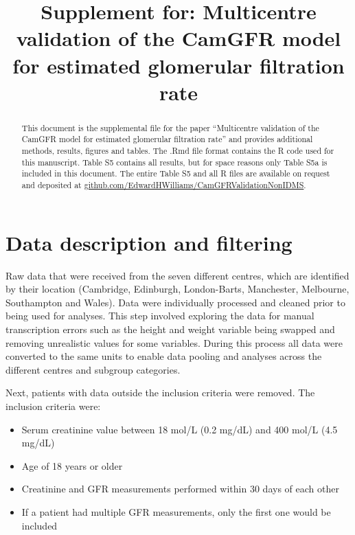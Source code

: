 \documentclass[11pt,]{article}
\title{Supplement for: Multicentre validation of the CamGFR model for estimated
glomerular filtration rate}
\author{}
\date{}
\newcommand{\beginsupplement}{\setcounter{table}{0} \renewcommand{\thetable}{S\arabic{table}} \setcounter{figure}{0} \renewcommand{\thefigure}{S\arabic{figure}}} \usepackage{breqn} \usepackage{biblatex} \usepackage{graphicx} \usepackage{textgreek}
\begin{document}
\maketitle
\begin{abstract}
This document is the supplemental file for the paper ``Multicentre
validation of the CamGFR model for estimated glomerular filtration
rate'' and provides additional methods, results, figures and tables. The
.Rmd file format contains the R code used for this manuscript. Table S5
contains all results, but for space reasons only Table S5a is included
in this document. The entire Table S5 and all R files are available on
request and deposited at
\href{https://github.com/EdwardHWilliams/CamGFRValidationNonIDMS}{github.com/EdwardHWilliams/CamGFRValidationNonIDMS}.
\end{abstract}

\beginsupplement

\section{Data description and
filtering}\label{data-description-and-filtering}

Raw data that were received from the seven different centres, which are
identified by their location (Cambridge, Edinburgh, London-Barts,
Manchester, Melbourne, Southampton and Wales). Data were individually
processed and cleaned prior to being used for analyses. This step
involved exploring the data for manual transcription errors such as the
height and weight variable being swapped and removing unrealistic values
for some variables. During this process all data were converted to the
same units to enable data pooling and analyses across the different
centres and subgroup categories.

Next, patients with data outside the inclusion criteria were removed.
The inclusion criteria were:

\begin{itemize}
\item Serum creatinine value between 18 \textmu mol/L (0.2 mg/dL) and 400 \textmu mol/L (4.5 mg/dL)
\item Age of 18 years or older
\item Creatinine and GFR measurements performed within 30 days of each other 
\item If a patient had multiple GFR measurements, only the first one would be included
\end{itemize}
\end{document}
